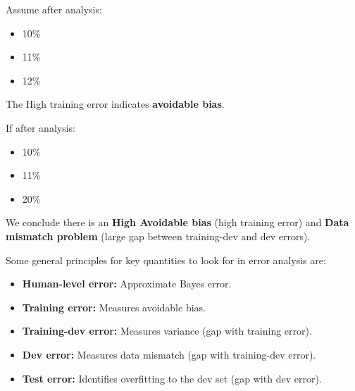 \documentclass[letterpaper,12pt,notitlepage,twoside]{report}
\begin{document}
Assume after analysis:
\begin{itemize}[nosep]
\item  {} 10\%
\item  {} 11\%
\item  {} 12\%
\end{itemize}
The High training error indicates \textbf{avoidable bias}.

If after analysis:
\begin{itemize}[nosep]
\item  {} 10\%
\item  {} 11\%
\item  {} 20\%
\end{itemize}
We conclude there is an \textbf{High Avoidable bias} (high training error) and \textbf{Data mismatch problem} (large gap between training-dev and dev errors).

Some general principles for key quantities to look for in error analysis are:
\begin{itemize}[nosep]
    \item \textbf{Human-level error:} Approximate Bayes error.
    \item \textbf{Training error:} Measures avoidable bias.
    \item \textbf{Training-dev error:} Measures variance (gap with training error).
    \item \textbf{Dev error:} Measures data mismatch (gap with training-dev error).
    \item \textbf{Test error:} Identifies overfitting to the dev set (gap with dev error).
\end{itemize}
\end{document}
